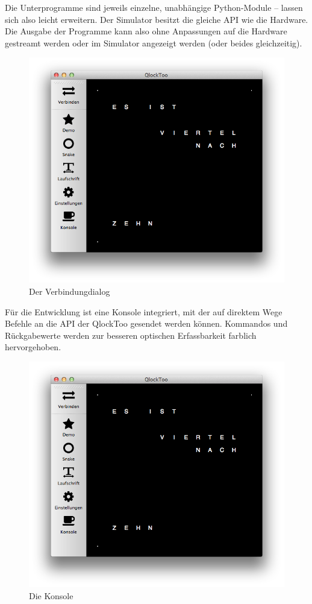 Die Unterprogramme sind jeweils einzelne, unabhängige Python-Module -- lassen sich also leicht erweitern.
Der Simulator besitzt die gleiche API wie die Hardware. Die Ausgabe der Programme kann also ohne Anpassungen auf die Hardware gestreamt werden oder im Simulator angezeigt werden (oder beides gleichzeitig).
%
\begin{figure}[h]
    \centering
    \includegraphics[width=\columnwidth,draft]{Abbildungen/Screenshot}
    \caption[Verbindungsdialog]{Der Verbindungdialog}
    \label{fig:Verbindungsdialog}
\end{figure}
%
Für die Entwicklung ist eine Konsole integriert, mit der auf direktem Wege Befehle an die API der QlockToo gesendet werden können. Kommandos und Rückgabewerte werden zur besseren optischen Erfassbarkeit farblich hervorgehoben.
%
\begin{figure}[h]
    \centering
    \includegraphics[draft,width=\columnwidth,draft]{Abbildungen/Screenshot}
    \caption[Konsole]{Die Konsole}
    \label{fig:Konsole}
\end{figure}
